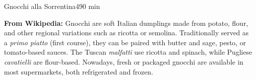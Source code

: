 \begin{recipebox}{Gnocchi alla Sorrentina}{4}{90 min}
  \begin{notes}
    \textbf{From Wikipedia:} Gnocchi are soft Italian dumplings made from potato, flour, and other regional variations such as ricotta or semolina.  
    Traditionally served as a \emph{primo piatto} (first course), they can be paired with butter and sage, pesto, or tomato-based sauces.  
    The Tuscan \emph{malfatti} use ricotta and spinach, while Pugliese \emph{cavatielli} are flour-based.  
    Nowadays, fresh or packaged gnocchi are available in most supermarkets, both refrigerated and frozen.
  \end{notes}
\end{recipebox}